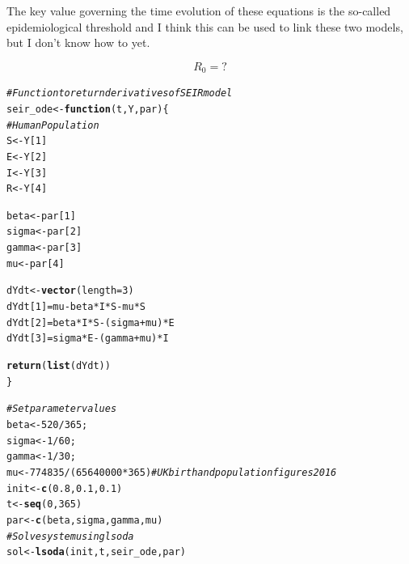 \documentclass{article}\usepackage[]{graphicx}\usepackage[]{color}
\makeatletter
\newcommand{\hlnum}[1]{\textcolor[rgb]{0.686,0.059,0.569}{#1}}%
\newcommand{\hlcom}[1]{\textcolor[rgb]{0.678,0.584,0.686}{\textit{#1}}}%
\newcommand{\hlopt}[1]{\textcolor[rgb]{0,0,0}{#1}}%
\newcommand{\hlstd}[1]{\textcolor[rgb]{0.345,0.345,0.345}{#1}}%
\newcommand{\hlkwa}[1]{\textcolor[rgb]{0.161,0.373,0.58}{\textbf{#1}}}%
\newcommand{\hlkwb}[1]{\textcolor[rgb]{0.69,0.353,0.396}{#1}}%
\newcommand{\hlkwc}[1]{\textcolor[rgb]{0.333,0.667,0.333}{#1}}%
\newcommand{\hlkwd}[1]{\textcolor[rgb]{0.737,0.353,0.396}{\textbf{#1}}}%
\newenvironment{kframe}{%
 \def\at@end@of@kframe{}%
 \ifinner\ifhmode%
  \def\at@end@of@kframe{\end{minipage}}%
  \begin{minipage}{\columnwidth}%
 \fi\fi%
 \def\FrameCommand##1{\hskip\@totalleftmargin \hskip-\fboxsep
 \colorbox{shadecolor}{##1}\hskip-\fboxsep
     \hskip-\linewidth \hskip-\@totalleftmargin \hskip\columnwidth}%
 \MakeFramed {\advance\hsize-\width
   \@totalleftmargin\z@ \linewidth\hsize
   \@setminipage}}%
 {\par\unskip\endMakeFramed%
 \at@end@of@kframe}
\newenvironment{knitrout}{}{} %
\makeatother
\begin{document}
The key value governing the time evolution of these equations is the so-called epidemiological threshold and I think this can be used to link these two models, but I don't know how to yet.

\begin{equation}
 R_0= ?
\end{equation}

\begin{knitrout}
\color{fgcolor}\begin{kframe}
\begin{alltt}
\hlcom{# Function to return derivatives of SEIR model}
\hlstd{seir_ode}\hlkwb{<-}\hlkwa{function}\hlstd{(}\hlkwc{t}\hlstd{,}\hlkwc{Y}\hlstd{,}\hlkwc{par}\hlstd{)\{}
\hlcom{# Human Population}
  \hlstd{S}\hlkwb{<-}\hlstd{Y[}\hlnum{1}\hlstd{]}
  \hlstd{E}\hlkwb{<-}\hlstd{Y[}\hlnum{2}\hlstd{]}
  \hlstd{I}\hlkwb{<-}\hlstd{Y[}\hlnum{3}\hlstd{]}
  \hlstd{R}\hlkwb{<-}\hlstd{Y[}\hlnum{4}\hlstd{]}

  \hlstd{beta}\hlkwb{<-}\hlstd{par[}\hlnum{1}\hlstd{]}
  \hlstd{sigma}\hlkwb{<-}\hlstd{par[}\hlnum{2}\hlstd{]}
  \hlstd{gamma}\hlkwb{<-}\hlstd{par[}\hlnum{3}\hlstd{]}
  \hlstd{mu}\hlkwb{<-}\hlstd{par[}\hlnum{4}\hlstd{]}

  \hlstd{dYdt}\hlkwb{<-}\hlkwd{vector}\hlstd{(}\hlkwc{length}\hlstd{=}\hlnum{3}\hlstd{)}
  \hlstd{dYdt[}\hlnum{1}\hlstd{]}\hlkwb{=}\hlstd{mu}\hlopt{-}\hlstd{beta}\hlopt{*}\hlstd{I}\hlopt{*}\hlstd{S}\hlopt{-}\hlstd{mu}\hlopt{*}\hlstd{S}
  \hlstd{dYdt[}\hlnum{2}\hlstd{]}\hlkwb{=}\hlstd{beta}\hlopt{*}\hlstd{I}\hlopt{*}\hlstd{S}\hlopt{-}\hlstd{(sigma}\hlopt{+}\hlstd{mu)}\hlopt{*}\hlstd{E}
  \hlstd{dYdt[}\hlnum{3}\hlstd{]}\hlkwb{=}\hlstd{sigma}\hlopt{*}\hlstd{E}\hlopt{-}\hlstd{(gamma}\hlopt{+}\hlstd{mu)}\hlopt{*}\hlstd{I}

  \hlkwd{return}\hlstd{(}\hlkwd{list}\hlstd{(dYdt))}
\hlstd{\}}


\hlcom{# Set parameter values}
\hlstd{beta}\hlkwb{<-}\hlnum{520}\hlopt{/}\hlnum{365}\hlstd{;}
\hlstd{sigma}\hlkwb{<-}\hlnum{1}\hlopt{/}\hlnum{60}\hlstd{;}
\hlstd{gamma}\hlkwb{<-}\hlnum{1}\hlopt{/}\hlnum{30}\hlstd{;}
\hlstd{mu}\hlkwb{<-}\hlnum{774835}\hlopt{/}\hlstd{(}\hlnum{65640000}\hlopt{*}\hlnum{365}\hlstd{)} \hlcom{# UK birth and population figures 2016}
\hlstd{init}\hlkwb{<-}\hlkwd{c}\hlstd{(}\hlnum{0.8}\hlstd{,}\hlnum{0.1}\hlstd{,}\hlnum{0.1}\hlstd{)}
\hlstd{t}\hlkwb{<-}\hlkwd{seq}\hlstd{(}\hlnum{0}\hlstd{,}\hlnum{365}\hlstd{)}
\hlstd{par}\hlkwb{<-}\hlkwd{c}\hlstd{(beta,sigma,gamma,mu)}
\hlcom{# Solve system using lsoda}
\hlstd{sol}\hlkwb{<-}\hlkwd{lsoda}\hlstd{(init,t,seir_ode,par)}


\end{alltt}
\end{kframe}
\end{knitrout}
\end{document}
